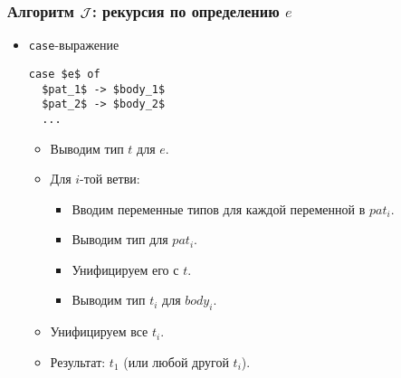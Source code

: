 \documentclass[11pt]{beamer}
\begin{document}
\begin{frame}[fragile]
\frametitle{Алгоритм $\mathcal{J}$: рекурсия по определению $e$}
\begin{itemize}
    \item \lstinline|case|-выражение
\begin{lstlisting}[mathescape]
case $e$ of
  $pat_1$ -> $body_1$
  $pat_2$ -> $body_2$
  ...
\end{lstlisting}
    \pause
    \begin{itemize}
        \item Выводим тип $t$ для $e$.
        \item Для $i$-той ветви:
        \begin{itemize}
            \pause
            \item Вводим переменные типов для каждой переменной в $pat_i$.
            \item Выводим тип для $pat_i$.
            \pause
            \item Унифицируем его с $t$.
            \pause
            \item Выводим тип $t_i$ для $body_i$.
        \end{itemize}
        \pause
        \item Унифицируем все $t_i$.
        \item Результат: \pause $t_1$ (или любой другой $t_i$).
    \end{itemize}
\end{itemize}
\end{frame}
\end{document}
